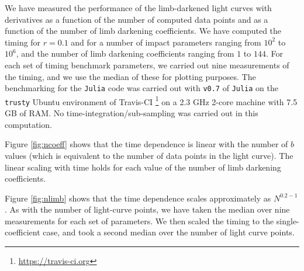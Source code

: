 \documentclass[modern,trackchanges]{aastex63}
\begin{document}
We have measured the performance of the limb-darkened light curves
with derivatives as a function of the number of computed data points
and as a function of the number of limb darkening coefficients.  We
have computed the timing for $r=0.1$ and for a number of impact
parameters ranging from $10^2$ to $10^6$, and the number of limb darkening
coefficients ranging from $1$ to $144$.  For each set of timing benchmark
parameters, we carried out nine measurements  of the timing, and
we use the median of these for plotting purposes.  The benchmarking
for the \texttt{Julia} code was carried out with \texttt{v0.7} of
\texttt{Julia} on the \texttt{trusty} Ubuntu environment of Travis-CI%
\footnote{\url{https://travis-ci.org}}
on a 2.3 GHz
2-core machine with 7.5 GB of RAM.
No time-integration/sub-sampling was carried out in this computation.

Figure \ref{fig:ncoeff} shows that the time dependence is linear with the
number of $b$ values (which is equivalent to the number of data points
in the light curve).  The linear scaling with time holds for each value of
the number of limb darkening coefficients.

Figure \ref{fig:nlimb} shows that the time dependence scales approximately
as $N^{0.2-1}$.  As with the number of light-curve points, we have taken
the median over nine measurements for each set of parameters.  We then
scaled the timing to the single-coefficient case, and took a second
median over the number of light curve points.
\end{document}
